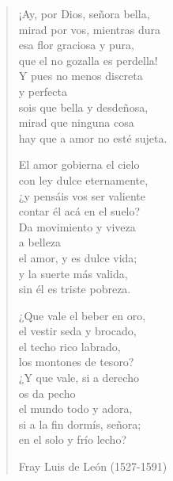 \documentclass[12pt, twoside]{book}
\begin{document}
\begin{verse}
¡Ay, por Dios, señora bella,\\
mirad por vos, mientras dura\\
esa flor graciosa y pura,\\
que el no gozalla es perdella!\\
Y pues no menos discreta\\
y perfecta\\
sois que bella y desdeñosa,\\
mirad que ninguna cosa \\
hay que a amor no esté sujeta.\newline

El amor gobierna el cielo\\
con ley dulce eternamente,\\
¿y pensáis vos ser valiente\\
contar él acá en el suelo?\\
Da movimiento y viveza\\
a belleza\\
el amor, y es dulce vida;\\
y la suerte más valida,\\
sin él es triste pobreza.\newpage

¿Que vale el beber en oro,\\
el vestir seda y brocado,\\
el techo rico labrado,\\
los montones de tesoro?\\
¿Y que vale, si a derecho\\
os da pecho\\
el mundo todo y adora,\\
si a la fin dormís, señora;\\
en el solo y frío lecho?\newline

Fray Luis de León (1527-1591)
\end{verse}
\newpage
\end{document}
